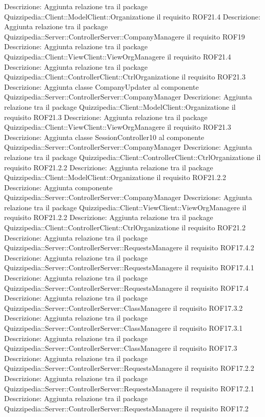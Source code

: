 Descrizione: Aggiunta relazione tra il package Quizzipedia::Client::ModelClient::Organizatione il requisito ROF21.4 
Descrizione: Aggiunta relazione tra il package Quizzipedia::Server::ControllerServer::CompanyManagere il requisito ROF19 
Descrizione: Aggiunta relazione tra il package Quizzipedia::Client::ViewClient::ViewOrgManagere il requisito ROF21.4 
Descrizione: Aggiunta relazione tra il package Quizzipedia::Client::ControllerClient::CtrlOrganizatione il requisito ROF21.3 
Descrizione: Aggiunta classe CompanyUpdater al componente Quizzipedia::Server::ControllerServer::CompanyManager 
Descrizione: Aggiunta relazione tra il package Quizzipedia::Client::ModelClient::Organizatione il requisito ROF21.3 
Descrizione: Aggiunta relazione tra il package Quizzipedia::Client::ViewClient::ViewOrgManagere il requisito ROF21.3 
Descrizione: Aggiunta classe SessionController10 al componente Quizzipedia::Server::ControllerServer::CompanyManager 
Descrizione: Aggiunta relazione tra il package Quizzipedia::Client::ControllerClient::CtrlOrganizatione il requisito ROF21.2.2 
Descrizione: Aggiunta relazione tra il package Quizzipedia::Client::ModelClient::Organizatione il requisito ROF21.2.2 
Descrizione: Aggiunta componente Quizzipedia::Server::ControllerServer::CompanyManager 
Descrizione: Aggiunta relazione tra il package Quizzipedia::Client::ViewClient::ViewOrgManagere il requisito ROF21.2.2 
Descrizione: Aggiunta relazione tra il package Quizzipedia::Client::ControllerClient::CtrlOrganizatione il requisito ROF21.2 
Descrizione: Aggiunta relazione tra il package Quizzipedia::Server::ControllerServer::RequestsManagere il requisito ROF17.4.2 
Descrizione: Aggiunta relazione tra il package Quizzipedia::Server::ControllerServer::RequestsManagere il requisito ROF17.4.1 
Descrizione: Aggiunta relazione tra il package Quizzipedia::Server::ControllerServer::RequestsManagere il requisito ROF17.4 
Descrizione: Aggiunta relazione tra il package Quizzipedia::Server::ControllerServer::ClassManagere il requisito ROF17.3.2 
Descrizione: Aggiunta relazione tra il package Quizzipedia::Server::ControllerServer::ClassManagere il requisito ROF17.3.1 
Descrizione: Aggiunta relazione tra il package Quizzipedia::Server::ControllerServer::ClassManagere il requisito ROF17.3 
Descrizione: Aggiunta relazione tra il package Quizzipedia::Server::ControllerServer::RequestsManagere il requisito ROF17.2.2 
Descrizione: Aggiunta relazione tra il package Quizzipedia::Server::ControllerServer::RequestsManagere il requisito ROF17.2.1 
Descrizione: Aggiunta relazione tra il package Quizzipedia::Server::ControllerServer::RequestsManagere il requisito ROF17.2 
